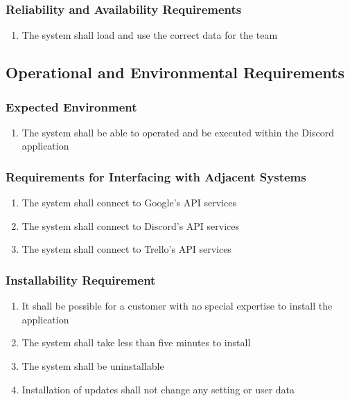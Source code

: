 \documentclass[12pt, titlepage]{article}
\begin{document}
\subsubsection{Reliability and Availability Requirements}
\begin{enumerate}[start=4, label={P\arabic*.}]
    \item The system shall load and use the correct data for the team
\end{enumerate}

\subsection{Operational and Environmental Requirements}
\subsubsection{Expected Environment}
\begin{enumerate}[start=1, label={OE\arabic*.}]
    \item The system shall be able to operated and be executed within the Discord application
\end{enumerate}
\subsubsection{Requirements for Interfacing with Adjacent Systems}
\begin{enumerate}[start=2, label={OE\arabic*.}]
    \item The system shall connect to Google's API services
    \item The system shall connect to Discord's API services
    \item The system shall connect to Trello's API services
\end{enumerate}
\subsubsection{Installability Requirement}
\begin{enumerate}[start=5, label={OE\arabic*.}]
    \item It shall be possible for a customer with no special expertise to install the application
    \item The system shall take less than five minutes to install
    \item The system shall be uninstallable
    \item Installation of updates shall not change any setting or user data
\end{enumerate}
\end{document}
